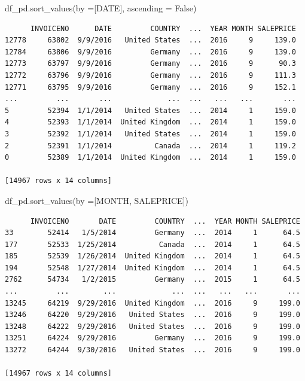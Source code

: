 \documentclass[
  letterpaper,
  DIV=11,
  numbers=noendperiod]{scrreprt}
\newenvironment{Shaded}{\begin{snugshade}}{\end{snugshade}}
\newcommand{\NormalTok}[1]{\textcolor[rgb]{0.00,0.23,0.31}{#1}}
\newcommand{\OperatorTok}[1]{\textcolor[rgb]{0.37,0.37,0.37}{#1}}
\newcommand{\StringTok}[1]{\textcolor[rgb]{0.13,0.47,0.30}{#1}}
\newcommand{\VariableTok}[1]{\textcolor[rgb]{0.07,0.07,0.07}{#1}}
\begin{document}
\begin{Shaded}
\begin{Highlighting}[]
\NormalTok{df\_pd.sort\_values(by }\OperatorTok{=}\NormalTok{[}\StringTok{\textquotesingle{}DATE\textquotesingle{}}\NormalTok{], ascending }\OperatorTok{=} \VariableTok{False}\NormalTok{)   }
\end{Highlighting}
\end{Shaded}

\begin{verbatim}
      INVOICENO      DATE         COUNTRY  ...  YEAR MONTH SALEPRICE
12778     63802  9/9/2016   United States  ...  2016     9     139.0
12784     63806  9/9/2016         Germany  ...  2016     9     139.0
12773     63797  9/9/2016         Germany  ...  2016     9      90.3
12772     63796  9/9/2016         Germany  ...  2016     9     111.3
12771     63795  9/9/2016         Germany  ...  2016     9     152.1
...         ...       ...             ...  ...   ...   ...       ...
5         52394  1/1/2014   United States  ...  2014     1     159.0
4         52393  1/1/2014  United Kingdom  ...  2014     1     159.0
3         52392  1/1/2014   United States  ...  2014     1     159.0
2         52391  1/1/2014          Canada  ...  2014     1     119.2
0         52389  1/1/2014  United Kingdom  ...  2014     1     159.0

[14967 rows x 14 columns]
\end{verbatim}

\begin{Shaded}
\begin{Highlighting}[]
\NormalTok{df\_pd.sort\_values(by }\OperatorTok{=}\NormalTok{[}\StringTok{\textquotesingle{}MONTH\textquotesingle{}}\NormalTok{, }\StringTok{\textquotesingle{}SALEPRICE\textquotesingle{}}\NormalTok{])}
\end{Highlighting}
\end{Shaded}

\begin{verbatim}
      INVOICENO       DATE         COUNTRY  ...  YEAR MONTH SALEPRICE
33        52414   1/5/2014         Germany  ...  2014     1      64.5
177       52533  1/25/2014          Canada  ...  2014     1      64.5
185       52539  1/26/2014  United Kingdom  ...  2014     1      64.5
194       52548  1/27/2014  United Kingdom  ...  2014     1      64.5
2762      54734   1/2/2015         Germany  ...  2015     1      64.5
...         ...        ...             ...  ...   ...   ...       ...
13245     64219  9/29/2016  United Kingdom  ...  2016     9     199.0
13246     64220  9/29/2016   United States  ...  2016     9     199.0
13248     64222  9/29/2016   United States  ...  2016     9     199.0
13251     64224  9/29/2016         Germany  ...  2016     9     199.0
13272     64244  9/30/2016   United States  ...  2016     9     199.0

[14967 rows x 14 columns]
\end{verbatim}
\end{document}

